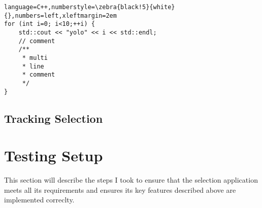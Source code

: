 \begin{lstlisting}
language=C++,numberstyle=\zebra{black!5}{white}{},numbers=left,xleftmargin=2em
for (int i=0; i<10;++i) {
	std::cout << "yolo" << i << std::endl;
	// comment
	/**
	 * multi
	 * line
	 * comment
	 */
}
\end{lstlisting}

\subsection{Tracking Selection}
\label{sec:tracking_selection}

\section{Testing Setup}
\label{sec:testing_setup}
This section will describe the steps I took to ensure that the selection application meets all its requirements and ensures its key features described above are implemented correclty.
